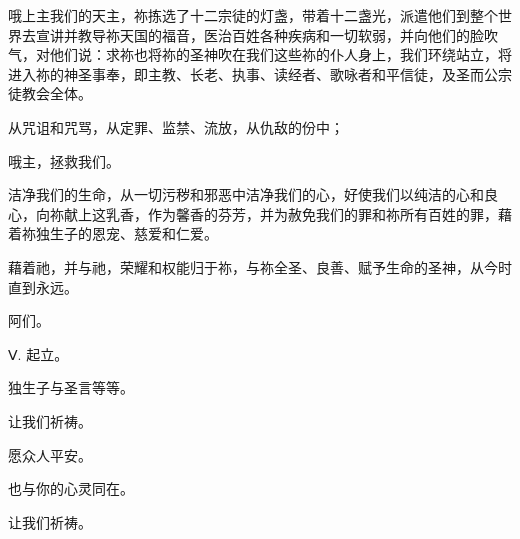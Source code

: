 哦上主我们的天主，祢拣选了十二宗徒的灯盏，带着十二盏光，派遣他们到整个世界去宣讲并教导祢天国的福音，医治百姓各种疾病和一切软弱，并向他们的脸吹气，对他们说：求祢也将祢的圣神吹在我们这些祢的仆人身上，我们环绕站立，将进入祢的神圣事奉，即主教、长老、执事、读经者、歌咏者和平信徒，及圣而公宗徒教会全体。\par

从咒诅和咒骂，从定罪、监禁、流放，从仇敌的份中；\par

哦主，拯救我们。\par

洁净我们的生命，从一切污秽和邪恶中洁净我们的心，好使我们以纯洁的心和良心，向祢献上这乳香，作为馨香的芬芳，并为赦免我们的罪和祢所有百姓的罪，藉着祢独生子的恩宠、慈爱和仁爱。\par

\par

藉着祂，并与祂，荣耀和权能归于祢，与祢全圣、良善、赋予生命的圣神，从今时直到永远。\par

\par

阿们。\par

\par

Ⅴ. 起立。\par

\par

独生子与圣言等等。\par

\par

让我们祈祷。\par

\par

愿众人平安。\par

\par

也与你的心灵同在。\par

\par

让我们祈祷。\par

